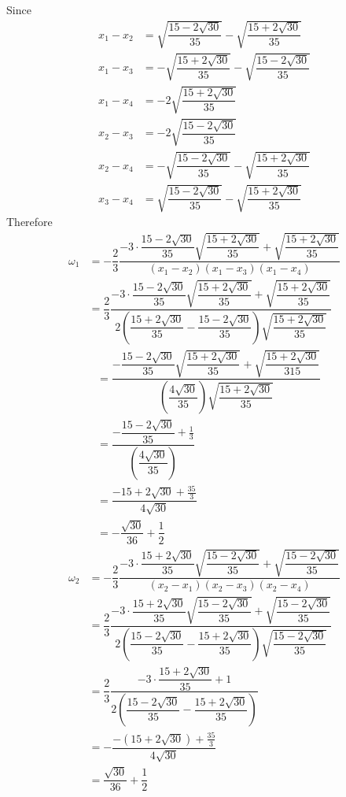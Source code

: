 \documentclass{article}
\begin{document}
\begin{enumerate}
Since \begin{align*}
x_1 - x_2 &= \sqrt{\dfrac{15- 2\sqrt{30}}{35}} - \sqrt{\dfrac{15+2\sqrt{30}}{35}}\\
x_1-x_3&=-\sqrt{\dfrac{15+ 2\sqrt{30}}{35}}-\sqrt{\dfrac{15- 2\sqrt{30}}{35}}\\
x_1-x_4&=-2\sqrt{\dfrac{15+ 2\sqrt{30}}{35}}\\
x_2-x_3&=-2\sqrt{\dfrac{15- 2\sqrt{30}}{35}}\\
x_2-x_4&=-\sqrt{\dfrac{15- 2\sqrt{30}}{35}}-\sqrt{\dfrac{15+ 2\sqrt{30}}{35}}\\
x_3-x_4 &=\sqrt{\dfrac{15- 2\sqrt{30}}{35}}-\sqrt{\dfrac{15+ 2\sqrt{30}}{35}}
\end{align*}
Therefore
\begin{align*}
\omega_1&=-\dfrac{2}{3}\dfrac{-3\cdot \dfrac{15-2\sqrt{30}}{35}\sqrt{\dfrac{15+2\sqrt{30}}{35}}+\sqrt{\dfrac{15+2\sqrt{30}}{35}}}{(x_1-x_2)(x_1-x_3)(x_1-x_4)}\\
&=\dfrac{2}{3}\dfrac{-3\cdot \dfrac{15-2\sqrt{30}}{35}\sqrt{\dfrac{15+2\sqrt{30}}{35}}+\sqrt{\dfrac{15+2\sqrt{30}}{35}}}{2(\dfrac{15+2\sqrt{30}}{35} -\dfrac{15- 2\sqrt{30}}{35} )\sqrt{\dfrac{15+ 2\sqrt{30}}{35}}}
        \end{align*}\begin{align*}
&=\dfrac{- \dfrac{15-2\sqrt{30}}{35}\sqrt{\dfrac{15+2\sqrt{30}}{35}}+\sqrt{\dfrac{15+2\sqrt{30}}{315}}}{(\dfrac{4\sqrt{30}}{35} )\sqrt{\dfrac{15+ 2\sqrt{30}}{35}}}\\
&=\dfrac{- \dfrac{15-2\sqrt{30}}{35}+\frac{1}{3}}{(\dfrac{4\sqrt{30}}{35} )}\\
&=\dfrac{- 15+2\sqrt{30}+\frac{35}{3}}{4\sqrt{30}}\\
&=-\dfrac{\sqrt{30}}{36}+\dfrac{1}{2}
\end{align*}
\begin{align*}
\omega_2&=-\dfrac{2}{3}\dfrac{-3\cdot \dfrac{15+2\sqrt{30}}{35}\sqrt{\dfrac{15-2\sqrt{30}}{35}}+\sqrt{\dfrac{15-2\sqrt{30}}{35}}}{(x_2-x_1)(x_2-x_3)(x_2-x_4)}\\
&=\dfrac{2}{3}\dfrac{-3\cdot \dfrac{15+2\sqrt{30}}{35}\sqrt{\dfrac{15-2\sqrt{30}}{35}}+\sqrt{\dfrac{15-2\sqrt{30}}{35}}}{2(\dfrac{15-2\sqrt{30}}{35} -\dfrac{15+ 2\sqrt{30}}{35} )\sqrt{\dfrac{15- 2\sqrt{30}}{35}}}\\
&=\dfrac{2}{3}\dfrac{-3\cdot \dfrac{15+2\sqrt{30}}{35}+1}{2(\dfrac{15-2\sqrt{30}}{35} -\dfrac{15+ 2\sqrt{30}}{35} )}\\
&=-\dfrac{- (15+2\sqrt{30})+\frac{35}{3}}{4\sqrt{30}}\\
&=\dfrac{\sqrt{30}}{36}+\dfrac{1}{2}

\end{align*}
\end{enumerate}
\end{document}
